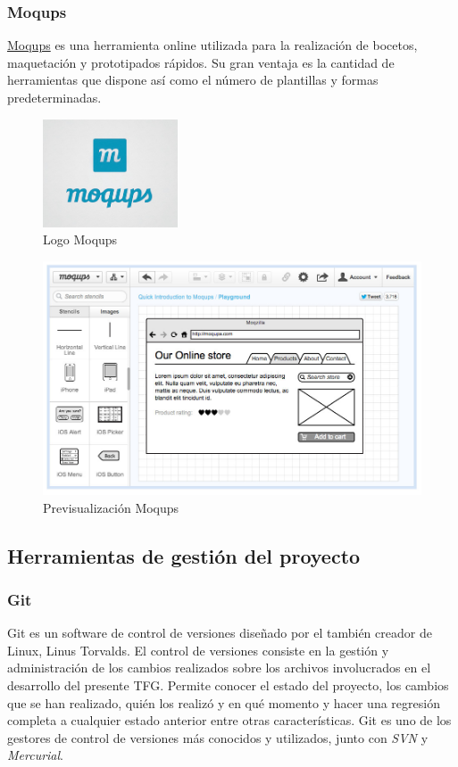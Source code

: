 		\subsubsection{Moqups}		
		\href{https://moqups.com}{Moqups} es una herramienta online utilizada para la realización de bocetos, maquetación y prototipados rápidos. Su gran ventaja es la cantidad de herramientas que dispone así como el número de plantillas y formas predeterminadas.
			
		\begin{figure}[H]
		\centering
		\includegraphics[width=40mm, fbox={\fboxrule} 4mm]{images/04-metodo/16-moqups_logo.png}
		\caption{Logo Moqups}
		\label{fig:moqups-logo}
		\end{figure}
		
		\begin{figure}[H]
		\centering
		\includegraphics[width=120mm, fbox={\fboxrule} 4mm]{images/04-metodo/17-moqups_preview.jpg}
		\caption{Previsualización Moqups}
		\label{fig:gantt-project-logo}
		\end{figure}
		
	\subsection{Herramientas de gestión del proyecto}
		\subsubsection{Git}
		Git es un software de control de versiones diseñado por el también creador de Linux, Linus Torvalds. El control de versiones consiste en la gestión y administración de los cambios realizados sobre los archivos involucrados en el desarrollo del presente \ac{TFG}. Permite conocer el estado del proyecto, los cambios que se han realizado, quién los realizó y en qué momento y hacer una regresión completa a cualquier estado anterior entre otras características.
		Git es uno de los gestores de control de versiones más conocidos y utilizados, junto con \textit{\ac{SVN}} y \textit{Mercurial}.
		
